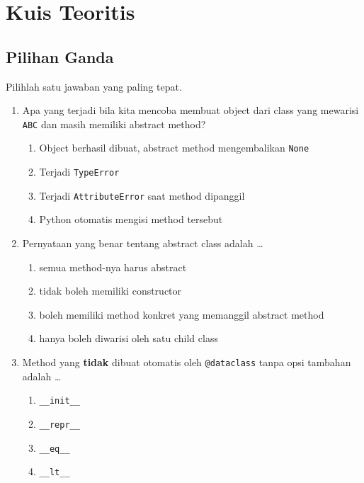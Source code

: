 \section{Kuis Teoritis}

\subsection{Pilihan Ganda}

Pilihlah satu jawaban yang paling tepat.

\begin{enumerate}
  \item Apa yang terjadi bila kita mencoba membuat object dari class yang mewarisi \texttt{ABC} dan masih memiliki abstract method?
  \begin{enumerate}[label=\alph*.,itemsep=0pt]
    \item Object berhasil dibuat, abstract method mengembalikan \texttt{None}
    \item Terjadi \texttt{TypeError}
    \item Terjadi \texttt{AttributeError} saat method dipanggil
    \item Python otomatis mengisi method tersebut
  \end{enumerate}

  \item Pernyataan yang benar tentang abstract class adalah \ldots
  \begin{enumerate}[label=\alph*.,itemsep=0pt]
    \item semua method-nya harus abstract
    \item tidak boleh memiliki constructor
    \item boleh memiliki method konkret yang memanggil abstract method
    \item hanya boleh diwarisi oleh satu child class
  \end{enumerate}

  \item Method yang \textbf{tidak} dibuat otomatis oleh \texttt{@dataclass} tanpa opsi tambahan adalah \ldots
  \begin{enumerate}[label=\alph*.,itemsep=0pt]
    \item \texttt{\_\_init\_\_}
    \item \texttt{\_\_repr\_\_}
    \item \texttt{\_\_eq\_\_}
    \item \texttt{\_\_lt\_\_}
  \end{enumerate}


\end{enumerate}
